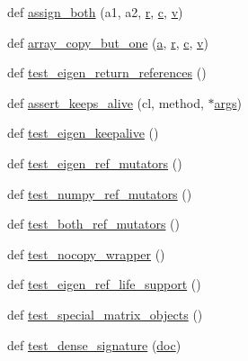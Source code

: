 \begin{DoxyCompactItemize}
def \mbox{\hyperlink{namespacetest__eigen_abb13eb1b9345438ca55edc9600b99f75}{assign\+\_\+both}} (a1, a2, \mbox{\hyperlink{_s_d_l__opengl_8h_a42ce7cdc612e53abee15043f80220d97}{r}}, \mbox{\hyperlink{_s_d_l__opengl__glext_8h_a1f2d7f8147412c43ba2303a56f97ee73}{c}}, \mbox{\hyperlink{_s_d_l__opengl_8h_a10a82eabcb59d2fcd74acee063775f90}{v}})
\item 
def \mbox{\hyperlink{namespacetest__eigen_a74cccbaeee0c7a25b7bf08e1e761d10e}{array\+\_\+copy\+\_\+but\+\_\+one}} (\mbox{\hyperlink{_s_d_l__opengl__glext_8h_a3309789fc188587d666cda5ece79cf82}{a}}, \mbox{\hyperlink{_s_d_l__opengl_8h_a42ce7cdc612e53abee15043f80220d97}{r}}, \mbox{\hyperlink{_s_d_l__opengl__glext_8h_a1f2d7f8147412c43ba2303a56f97ee73}{c}}, \mbox{\hyperlink{_s_d_l__opengl_8h_a10a82eabcb59d2fcd74acee063775f90}{v}})
\item 
def \mbox{\hyperlink{namespacetest__eigen_acfae2bd075543f6187c7849ddba6ae7c}{test\+\_\+eigen\+\_\+return\+\_\+references}} ()
\item 
def \mbox{\hyperlink{namespacetest__eigen_a9b02a089f59e0c07c01c2e43000c2558}{assert\+\_\+keeps\+\_\+alive}} (cl, method, $\ast$\mbox{\hyperlink{classargs}{args}})
\item 
def \mbox{\hyperlink{namespacetest__eigen_a495316a5384cfbd729b406311eedd73f}{test\+\_\+eigen\+\_\+keepalive}} ()
\item 
def \mbox{\hyperlink{namespacetest__eigen_a6eb57ebc470780c092ef584ff89802a9}{test\+\_\+eigen\+\_\+ref\+\_\+mutators}} ()
\item 
def \mbox{\hyperlink{namespacetest__eigen_a10599f730758d79998897fe3cae14135}{test\+\_\+numpy\+\_\+ref\+\_\+mutators}} ()
\item 
def \mbox{\hyperlink{namespacetest__eigen_afb616baf11d5ad1e2c56d8ea7c841487}{test\+\_\+both\+\_\+ref\+\_\+mutators}} ()
\item 
def \mbox{\hyperlink{namespacetest__eigen_a5e82145a28d8d85695922c17514ccf48}{test\+\_\+nocopy\+\_\+wrapper}} ()
\item 
def \mbox{\hyperlink{namespacetest__eigen_afc36cc526e4ac07cb0d8d874b189bbb0}{test\+\_\+eigen\+\_\+ref\+\_\+life\+\_\+support}} ()
\item 
def \mbox{\hyperlink{namespacetest__eigen_a9a2f9d62906337977f58b51e37170b7f}{test\+\_\+special\+\_\+matrix\+\_\+objects}} ()
\item 
def \mbox{\hyperlink{namespacetest__eigen_a61d80fa73bf0e2246a38e2b0181330ed}{test\+\_\+dense\+\_\+signature}} (\mbox{\hyperlink{structdoc}{doc}})
\item 

\end{DoxyCompactItemize}
